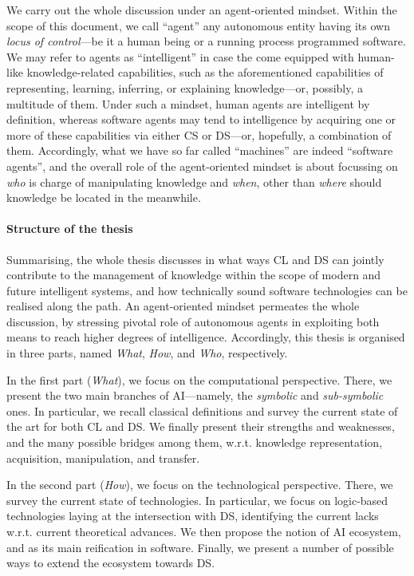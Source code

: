 \documentclass[12pt,a4paper,openright,twoside]{book}
\begin{document}
We carry out the whole discussion under an agent-oriented mindset.
%
Within the scope of this document, we call ``agent'' any autonomous entity having its own \emph{locus of control}---be it a human being or a running process programmed software.
%
We may refer to agents as ``intelligent'' in case the come equipped with human-like knowledge-related capabilities, such as the aforementioned capabilities of representing, learning, inferring, or explaining knowledge---or, possibly, a multitude of them.
%
Under such a mindset, human agents are intelligent by definition, whereas software agents may tend to intelligence by acquiring one or more of these capabilities via either CS or DS---or, hopefully, a combination of them.
%
Accordingly, what we have so far called ``machines'' are indeed ``software agents'', and the overall role of the agent-oriented mindset is about focussing on \emph{who} is charge of manipulating knowledge and \emph{when}, other than \emph{where} should knowledge be located in the meanwhile.


\paragraph{Structure of the thesis}

Summarising, the whole thesis discusses in what ways CL and DS can jointly contribute to the management of knowledge within the scope of modern and future intelligent systems, and how technically sound software technologies can be realised along the path.
%
An agent-oriented mindset permeates the whole discussion, by stressing pivotal role of autonomous agents in exploiting both means to reach higher degrees of intelligence.
%
Accordingly, this thesis is organised in three parts, named \emph{What}, \emph{How}, and \emph{Who}, respectively.

In the first part (\emph{What}), we focus on the computational perspective.
%
There, we present the two main branches of AI---namely, the \emph{symbolic} and \emph{sub-symbolic} ones.
%
In particular, we recall classical definitions and survey the current state of the art for both CL and DS.
%
We finally present their strengths and weaknesses, and the many possible bridges among them, w.r.t. knowledge representation, acquisition, manipulation, and transfer.

In the second part (\emph{How}), we focus on the technological perspective.
%
There, we survey the current state of technologies.
%
In particular, we focus on logic-based technologies laying at the intersection with DS, identifying the current lacks w.r.t. current theoretical advances.
%
We then propose the notion of AI ecosystem, and \twopkt{} as its main reification in software.
%
Finally, we present a number of possible ways to extend the \twopkt{} ecosystem towards DS.
\end{document}
